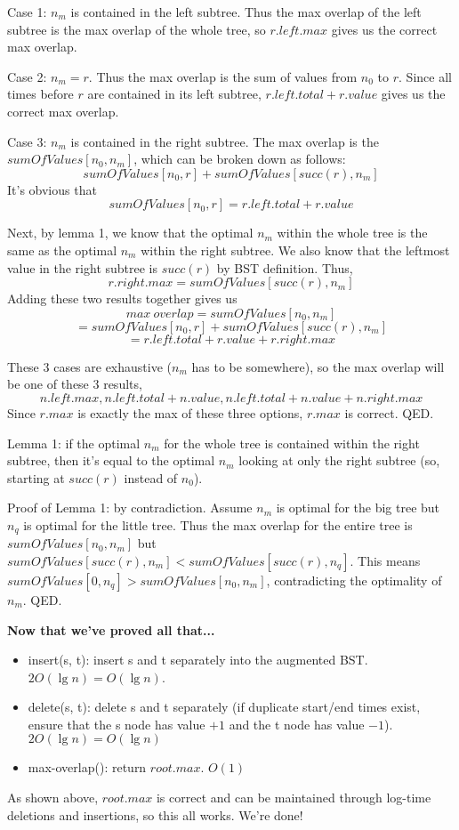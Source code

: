 \documentclass{article}
\renewcommand{\b}[1]{\textbf{#1}}
\begin{document}
\begin{enumerate}[i.]
  Case 1: $n_m$ is contained in the left subtree. Thus the max overlap of the left subtree is the max overlap of the whole tree, so $r.left.max$ gives us the correct max overlap.

  Case 2: $n_m = r$. Thus the max overlap is the sum of values from $n_0$ to $r$. Since all times before $r$ are contained in its left subtree, $r.left.total + r.value$ gives us the correct max overlap.

  Case 3: $n_m$ is contained in the right subtree. The max overlap is the $sumOfValues[n_0, n_m]$, which can be broken down as follows: $$sumOfValues[n_0, r] + sumOfValues[succ(r), n_m]$$
  It's obvious that 
  $$sumOfValues[n_0, r] = r.left.total + r.value$$

  Next, by lemma 1, we know that the optimal $n_m$ within the whole tree is the same as the optimal $n_m$ within the right subtree. We also know that the leftmost value in the right subtree is $succ(r)$ by BST definition. Thus, 
  $$r.right.max = sumOfValues[succ(r), n_m]$$
  Adding these two results together gives us
  $$max\ overlap = sumOfValues[n_0, n_m]$$
  $$= sumOfValues[n_0, r] + sumOfValues[succ(r), n_m]$$
  $$= r.left.total + r.value + r.right.max$$

  These 3 cases are exhaustive ($n_m$ has to be somewhere), so the max overlap will be one of these 3 results, 
  $$n.left.max, n.left.total + n.value, n.left.total + n.value + n.right.max$$
  Since $r.max$ is exactly the max of these three options, $r.max$ is correct. QED.

  Lemma 1: if the optimal $n_m$ for the whole tree is contained within the right subtree, then it's equal to the optimal $n_m$ looking at only the right subtree (so, starting at $succ(r)$ instead of $n_0$).

  Proof of Lemma 1: by contradiction. Assume $n_m$ is optimal for the big tree but $n_q$ is optimal for the little tree. Thus the max overlap for the entire tree is $sumOfValues[n_0, n_m]$ but $sumOfValues[succ(r), n_m] < sumOfValues[succ(r), n_q]$. This means $sumOfValues[0, n_q] > sumOfValues[n_0, n_m]$, contradicting the optimality of $n_m$. QED.

  \b{Now that we've proved all that...}
  \begin{itemize}
    \item insert(s, t): insert s and t separately into the augmented BST. $2O(\lg n) = O(\lg n)$.
    \item delete(s, t): delete s and t separately (if duplicate start/end times exist, ensure that the s node has value $+1$ and the t node has value $-1$). $2O(\lg n) = O(\lg n)$
    \item max-overlap(): return $root.max$. $O(1)$
\end{itemize}
As shown above, $root.max$ is correct and can be maintained through log-time deletions and insertions, so this all works. We're done!

\end{enumerate}
\end{document}
